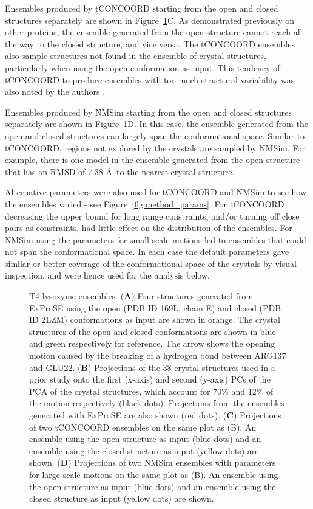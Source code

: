 Ensembles produced by tCONCOORD starting from the open and closed structures separately are shown in Figure~\ref{fig:t4l}C.
As demonstrated previously on other proteins, the ensemble generated from the open structure cannot reach all the way to the closed structure, and vice versa.
The tCONCOORD ensembles also sample structures not found in the ensemble of crystal structures, particularly when using the open conformation as input.
This tendency of tCONCOORD to produce ensembles with too much structural variability was also noted by the authors \cite{Seeliger2009}.

Ensembles produced by NMSim starting from the open and closed structures separately are shown in Figure~\ref{fig:t4l}D.
In this case, the ensemble generated from the open and closed structures can largely span the conformational space.
Similar to tCONCOORD, regions not explored by the crystals are sampled by NMSim.
For example, there is one model in the ensemble generated from the open structure that has an RMSD of 7.38 \AA\ to the nearest crystal structure.

Alternative parameters were also used for tCONCOORD and NMSim to see how the ensembles varied - see Figure~\ref{fig:method_params}.
For tCONCOORD decreasing the upper bound for long range constraints, and/or turning off close pairs as constraints, had little effect on the distribution of the ensembles.
For NMSim using the parameters for small scale motions led to ensembles that could not span the conformational space.
In each case the default parameters gave similar or better coverage of the conformational space of the crystals by visual inspection, and were hence used for the analysis below.


\begin{figure}
\centering


\caption{T4-lysozyme ensembles.
(\textbf{A}) Four structures generated from ExProSE using the open (PDB ID 169L, chain E)  and closed (PDB ID 2LZM) conformations as input are shown in orange.
The crystal structures of the open and closed conformations are shown in blue and green respectively for reference.
The arrow shows the opening motion caused by the breaking of a hydrogen bond between ARG137 and GLU22.
(\textbf{B}) Projections of the 38 crystal structures used in a prior study \cite{DeGroot1998} onto the first (x-axis) and second (y-axis) PCs of the PCA of the crystal structures, which account for 70\% and 12\% of the motion respectively (black dots).
Projections from the ensembles generated with ExProSE are also shown (red dots).
(\textbf{C}) Projections of two tCONCOORD ensembles on the same plot as (B).
An ensemble using the open structure as input (blue dots) and an ensemble using the closed structure as input (yellow dots) are shown.
(\textbf{D}) Projections of two NMSim ensembles with parameters for large scale motions on the same plot as (B).
An ensemble using the open structure as input (blue dots) and an ensemble using the closed structure as input (yellow dots) are shown.}

\label{fig:t4l}
\end{figure}


